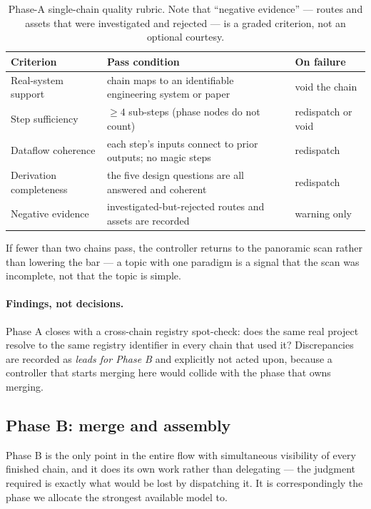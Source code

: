 \documentclass[10pt,a4paper]{article}
\begin{document}
\begin{table}[htbp]
\centering\small
\caption{Phase-A single-chain quality rubric. Note that ``negative evidence''
--- routes and assets that were investigated and rejected --- is a graded
criterion, not an optional courtesy.}
\label{tab:chaingate}
\begin{tabular}{@{}p{38mm}p{62mm}p{34mm}@{}}
\toprule
Criterion & Pass condition & On failure \\
\midrule
Real-system support & chain maps to an identifiable engineering system or paper & void the chain \\
Step sufficiency & ${\geq}4$ sub-steps (phase nodes do not count) & redispatch or void \\
Dataflow coherence & each step's inputs connect to prior outputs; no magic steps & redispatch \\
Derivation completeness & the five design questions are all answered and coherent & redispatch \\
Negative evidence & investigated-but-rejected routes and assets are recorded & warning only \\
\bottomrule
\end{tabular}
\end{table}

\noindent If fewer than two chains pass, the controller returns to the panoramic
scan rather than lowering the bar --- a topic with one paradigm is a signal that
the scan was incomplete, not that the topic is simple.

\paragraph{Findings, not decisions.} Phase A closes with a cross-chain registry
spot-check: does the same real project resolve to the same registry identifier in
every chain that used it? Discrepancies are recorded as \emph{leads for Phase B}
and explicitly not acted upon, because a controller that starts merging here
would collide with the phase that owns merging.

\subsection{Phase B: merge and assembly}
\label{sec:phaseB}

Phase B is the only point in the entire flow with simultaneous visibility of
every finished chain, and it does its own work rather than delegating --- the
judgment required is exactly what would be lost by dispatching it. It is
correspondingly the phase we allocate the strongest available model to.
\end{document}
